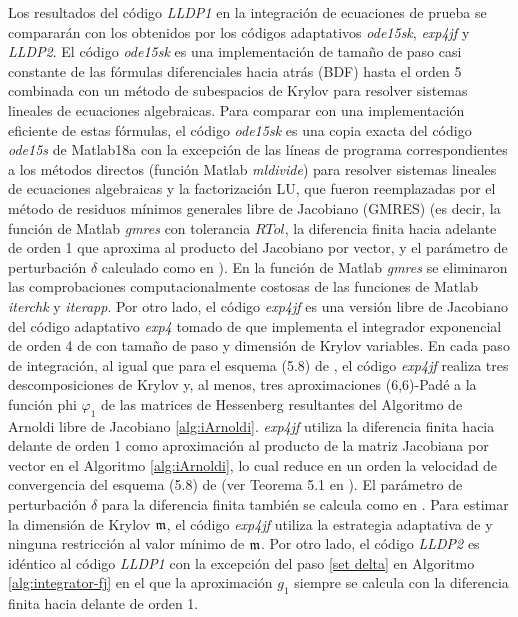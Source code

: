 Los resultados del código \emph{LLDP1} en la integración de ecuaciones de prueba se compararán con los obtenidos por los códigos adaptativos \emph{ode15sk}, \emph{exp4jf} y \emph{LLDP2}. El código \emph{ode15sk} es una implementación de tamaño de paso casi constante de las fórmulas diferenciales hacia atrás (BDF) hasta el orden 5 combinada con un método de subespacios de Krylov para resolver sistemas lineales de ecuaciones algebraicas. Para comparar con una implementación eficiente de estas fórmulas, el código \emph{ode15sk} es una copia exacta del código \emph{ode15s} \cite{shampine1997matlab} de Matlab18a con la excepción de las líneas de programa correspondientes a los métodos directos (función Matlab \emph{mldivide}) para resolver sistemas lineales de ecuaciones algebraicas y la factorización LU, que fueron reemplazadas por el método de residuos mínimos generales libre de Jacobiano (GMRES) (es decir, la función de Matlab \emph{gmres} con tolerancia $RTol$, la diferencia finita  hacia adelante de orden 1 que aproxima al producto del Jacobiano por  vector, y el parámetro de perturbación $\delta$ calculado como en \cite{knoll2004jacobian}). En la función de Matlab \emph{gmres} se eliminaron las comprobaciones computacionalmente costosas de las funciones de Matlab \emph{iterchk} y \emph{iterapp}. Por otro lado, el código \emph{exp4jf} es una versión libre de Jacobiano del código adaptativo \emph{exp4} tomado de \cite{jansing2011expode} que implementa el integrador exponencial de orden 4 de \cite{hochbruck1998exponential} con tamaño de paso y dimensión de Krylov variables.
En cada paso de integración, al igual que para el esquema (5.8) de \cite{hochbruck1998exponential}, el código \textit{exp4jf} realiza tres descomposiciones de Krylov y, al menos, tres aproximaciones (6,6)-Padé a la función phi $\varphi_1$ de las matrices de Hessenberg resultantes del Algoritmo de Arnoldi libre de Jacobiano \ref{alg:iArnoldi}. \textit{exp4jf} utiliza la diferencia finita hacia delante de orden 1 como aproximación al producto de la matriz Jacobiana por vector en el Algoritmo \ref{alg:iArnoldi}, lo cual reduce en un orden la velocidad de convergencia del esquema (5.8) de \cite{hochbruck1998exponential} (ver Teorema 5.1 en \cite{hochbruck1998exponential}).
El parámetro de perturbación $\delta$ para la diferencia finita también se calcula como en \cite{knoll2004jacobian}. Para estimar la dimensión de Krylov $\mathfrak{m}$, el código \textit{exp4jf} utiliza la estrategia adaptativa de \cite{hochbruck1998exponential} y ninguna restricción al valor mínimo de $\mathfrak{m}$. Por otro lado, el código \emph{LLDP2} es idéntico al código \emph{LLDP1} con la excepción del paso \ref{set delta} en Algoritmo \ref{alg:integrator-fj} en el que la aproximación $g_1$ siempre se calcula con la diferencia finita hacia delante de orden 1. 

